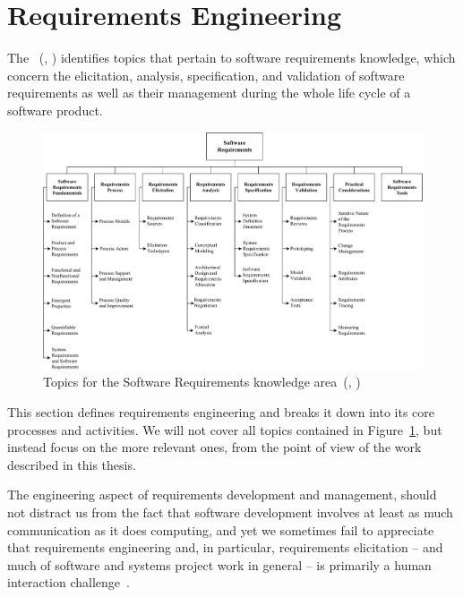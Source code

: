 \documentclass[dissertation,final]{softeng}
\begin{document}
\section{Requirements Engineering}
\label{sec:requirements_eng}
The \emph{}~(, \citeyear{SWEBOK}) identifies topics that pertain to software requirements knowledge, which concern the elicitation, analysis, specification, and validation of software requirements as well as their management during the whole life cycle of a software product.


\begin{figure}
\includegraphics[width=\columnwidth]{swebooksoftwarerequirements}
\centering
\caption[Topics for software requirements]{Topics for the Software Requirements knowledge area~(, \citeyear{SWEBOK})}
\label{fig:swebook_software_requirements}
\end{figure}

This section defines requirements engineering and breaks it down into its core processes and activities. We will not cover all topics contained in Figure~\ref{fig:swebook_software_requirements}, but instead focus on the more relevant ones, from the point of view of the work described in this thesis. 

The engineering aspect of requirements development and management, should not distract us from the fact that software development involves at least as much communication as it does computing, and yet we sometimes fail to appreciate that requirements engineering and, in particular, requirements elicitation -- and much of software and systems project work in general -- is primarily a human interaction challenge~\citep{Wiegers2013}. 
\end{document}
